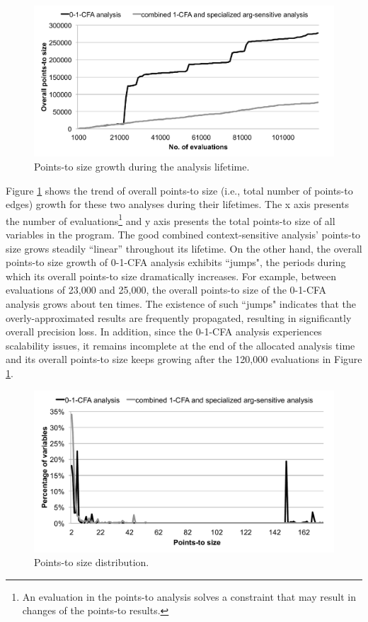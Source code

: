 \begin{figure}[th!]
        \includegraphics[width=\columnwidth]{pts-growth}
\caption{\textmd{Points-to size growth during the analysis lifetime.}}
\label{fig:pts-growth}
\end{figure}

Figure \ref{fig:pts-growth} shows the trend of overall points-to size (i.e., total number of points-to edges) growth for these two analyses during their lifetimes. The x axis presents the number of evaluations\footnote{An evaluation in the points-to analysis solves a constraint that may result in changes of the points-to results.} and y axis presents the total points-to size of all variables in the program. The good combined context-sensitive analysis' points-to size grows steadily ``linear'' throughout its lifetime. On the other hand, the overall points-to size growth of 0-1-CFA analysis exhibits ``jumps", the periods during which its overall points-to size dramatically increases. For example, between evaluations of 23,000 and 25,000, the overall points-to size of the 0-1-CFA analysis grows about ten times. The existence of such ``jumps" indicates that the overly-approximated results are frequently propagated, resulting in significantly overall precision loss. In addition, since the 0-1-CFA analysis experiences scalability issues, it remains incomplete at the end of the allocated analysis time and its overall points-to size keeps growing after the 120,000 evaluations in Figure \ref{fig:pts-growth}.

\begin{figure}[th!]
        \includegraphics[width=\columnwidth]{pts-distribution}
\caption{\textmd{Points-to size distribution.}}
\label{fig:pts-distribution}
\end{figure}

